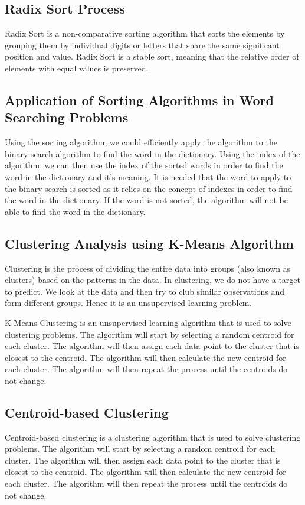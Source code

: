 \documentclass[11pt]{article}
\begin{document}
\begin{multicols*}{2}
    \subsection*{Radix Sort Process}
    \par Radix Sort is a non-comparative sorting algorithm that sorts the elements by grouping them by individual digits or letters that share the same significant position and value. Radix Sort is a stable sort, meaning that the relative order of elements with equal values is preserved. 
    \subsection*{Application of Sorting Algorithms in Word Searching Problems}
    \par Using the sorting algorithm, we could efficiently apply the algorithm to the binary search algorithm to find the word in the dictionary. Using the index of the algorithm, we can then use the index of the sorted words in order to find the word in the dictionary and it's meaning. It is needed that the word to apply to the binary search is sorted as it relies on the concept of indexes in order to find the word in the dictionary. If the word is not sorted, the algorithm will not be able to find the word in the dictionary. 
    \subsection*{Clustering Analysis using K-Means Algorithm}
    \par Clustering is the process of dividing the entire data into groups (also known as clusters) based on the patterns in the data. In clustering, we do not have a target to predict. We look at the data and then try to club similar observations and form different groups. Hence it is an unsupervised learning problem. 
    \par K-Means Clustering is an unsupervised learning algorithm that is used to solve clustering problems. The algorithm will start by selecting a random centroid for each cluster. The algorithm will then assign each data point to the cluster that is closest to the centroid. The algorithm will then calculate the new centroid for each cluster. The algorithm will then repeat the process until the centroids do not change.
    \subsection*{Centroid-based Clustering}
    \par Centroid-based clustering is a clustering algorithm that is used to solve clustering problems. The algorithm will start by selecting a random centroid for each cluster. The algorithm will then assign each data point to the cluster that is closest to the centroid. The algorithm will then calculate the new centroid for each cluster. The algorithm will then repeat the process until the centroids do not change.
    \medskip
    \printbibliography[title={References}]
    \end{multicols*}
\end{document}
